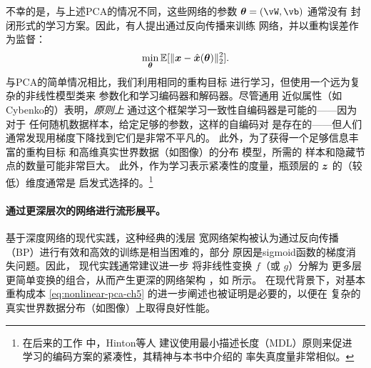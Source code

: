 \documentclass[../../book-main.tex]{subfiles}
\begin{document}
不幸的是，与上述PCA的情况不同，这些网络的参数 $\boldsymbol{\theta} =
(\vW, \vb)$ 通常没有
封闭形式的学习方案。因此，有人提出通过反向传播来训练
网络，并以重构误差作为监督：
\begin{equation}\label{eq:nonlinear-pca-ch5}
  \min_{\boldsymbol{\theta}} \mathbb{E}[ \|\bm{x} - \hat{\bm{x}}(\boldsymbol{\theta})\|_2^2].
\end{equation}
与PCA的简单情况相比，我们利用相同的重构目标
进行学习，但使用一个远为复杂的非线性模型类来
参数化和学习编码器和解码器。尽管通用
近似属性（如Cybenko的）表明，\textit{原则上}
通过这个框架学习一致性自编码器是可能的——因为对于
任何随机数据样本，给定足够的参数，这样的自编码对
是存在的——但人们通常发现用梯度下降找到它们是非常不平凡的。
此外，为了获得一个足够信息丰富的重构目标
和高维真实世界数据（如图像）的分布
模型，所需的
样本和隐藏节点的数量可能非常巨大。
此外，作为学习表示紧凑性的度量，瓶颈层的
$\bm{z}$ 的（较低）维度通常是
启发式选择的。\footnote{在后来的工作 \cite{Hinton-1993} 中，Hinton等人
  建议使用最小描述长度（MDL）原则来促进
  学习的编码方案的紧凑性，其精神与本书中介绍的
率失真度量非常相似。}

\paragraph{通过更深层次的网络进行流形展平。}
基于深度网络的现代实践，这种经典的浅层
宽网络架构被认为通过反向传播（BP）进行有效和高效的训练是相当困难的，部分
原因是sigmoid函数的梯度消失问题。因此，
现代实践通常建议进一步
将非线性变换 $f$（或 $g$）分解为
更多层更简单变换的组合，从而产生更深的网络架构
\cite{Hinton504}，如  所示。
在现代背景下，对基本重构成本
\eqref{eq:nonlinear-pca-ch5} 的进一步阐述也被证明是必要的，以便在
复杂的真实世界数据分布（如图像）上取得良好性能。
\end{document}
